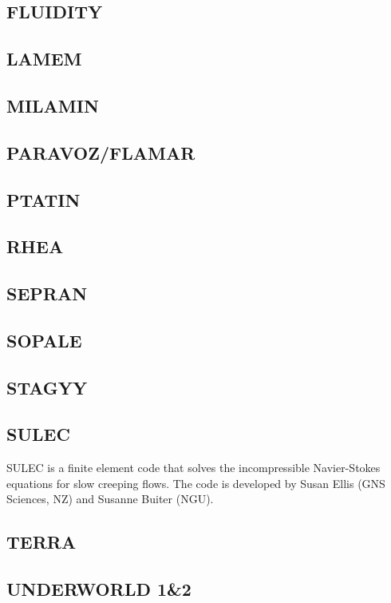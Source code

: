 \subsection{FLUIDITY}

\subsection{LAMEM}

\subsection{MILAMIN}

\subsection{PARAVOZ/FLAMAR}

\subsection{PTATIN}

\subsection{RHEA}

\subsection{SEPRAN}

\subsection{SOPALE}

\subsection{STAGYY}

\subsection{SULEC}
SULEC is a finite element code that solves the incompressible Navier-Stokes equations 
for slow creeping flows. The code is developed by Susan Ellis 
(GNS Sciences, NZ) and Susanne Buiter (NGU). 


\subsection{TERRA}

\subsection{UNDERWORLD 1\&2}



